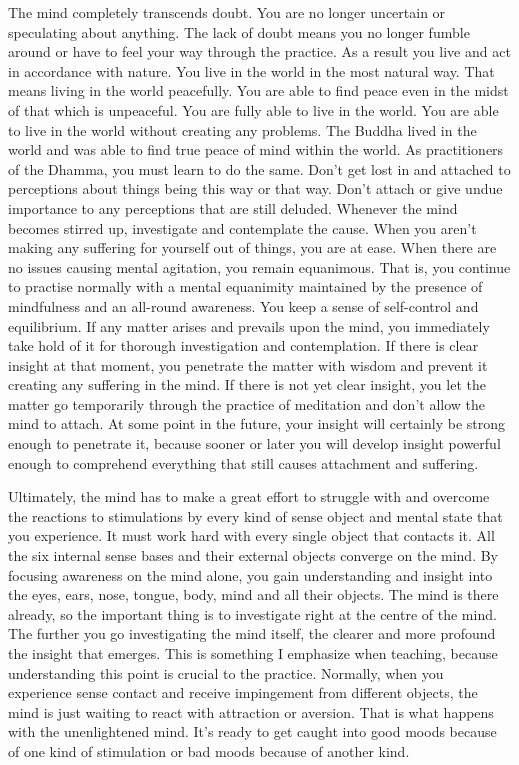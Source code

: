 The mind completely transcends doubt. You are no longer uncertain or speculating about anything. The lack of doubt means you no longer fumble around or have to feel your way through the practice. As a result you live and act in accordance with nature. You live in the world in the most natural way. That means living in the world peacefully. You are able to find peace even in the midst of that which is unpeaceful. You are fully able to live in the world. You are able to live in the world without creating any problems. The Buddha lived in the world and was able to find true peace of mind within the world. As practitioners of the Dhamma, you must learn to do the same. Don't get lost in and attached to perceptions about things being this way or that way. Don't attach or give undue importance to any perceptions that are still deluded. Whenever the mind becomes stirred up, investigate and contemplate the cause. When you aren't making any suffering for yourself out of things, you are at ease. When there are no issues causing mental agitation, you remain equanimous. That is, you continue to practise normally with a mental equanimity maintained by the presence of mindfulness and an all-round awareness. You keep a sense of self-control and equilibrium. If any matter arises and prevails upon the mind, you immediately take hold of it for thorough investigation and contemplation. If there is clear insight at that moment, you penetrate the matter with wisdom and prevent it creating any suffering in the mind. If there is not yet clear insight, you let the matter go temporarily through the practice of  meditation and don't allow the mind to attach. At some point in the future, your insight will certainly be strong enough to penetrate it, because sooner or later you will develop insight powerful enough to comprehend everything that still causes attachment and suffering.

Ultimately, the mind has to make a great effort to struggle with and overcome the reactions to stimulations by every kind of sense object and mental state that you experience. It must work hard with every single object that contacts it. All the six internal sense bases and their external objects converge on the mind. By focusing awareness on the mind alone, you gain understanding and insight into the eyes, ears, nose, tongue, body, mind and all their objects. The mind is there already, so the important thing is to investigate right at the centre of the mind. The further you go investigating the mind itself, the clearer and more profound the insight that emerges. This is something I emphasize when teaching, because understanding this point is crucial to the practice. Normally, when you experience sense contact and receive impingement from different objects, the mind is just waiting to react with attraction or aversion. That is what happens with the unenlightened mind. It's ready to get caught into good moods because of one kind of stimulation or bad moods because of another kind.

